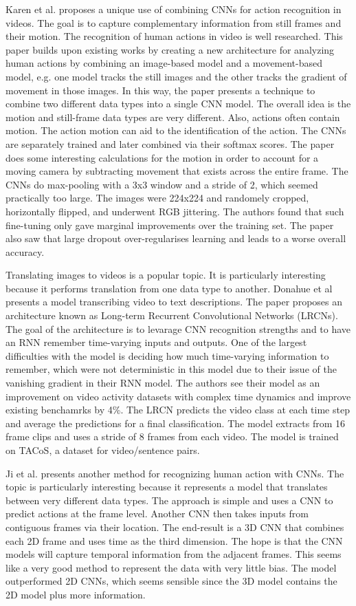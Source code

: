 Karen et al. proposes a unique use of combining CNNs for action recognition in videos.  The goal is to capture complementary information from still frames and their motion. The recognition of human actions in video is well researched.  This paper builds upon existing works by creating a new architecture for analyzing human actions by combining an image-based model and a movement-based model, e.g. one model tracks the still images and the other tracks the gradient of movement in those images.  In this way, the paper presents a technique to combine two different data types into a single CNN model.  The overall idea is the motion and still-frame data types are very different. Also, actions often contain motion.  The action motion can aid to the identification of the action.  The CNNs are separately trained and later combined via their softmax scores.  The paper does some interesting calculations for the motion in order to account for a moving camera by subtracting movement that exists across the entire frame.  The CNNs do max-pooling with a 3x3 window and a stride of 2, which seemed practically too large.  The images were 224x224 and randomely cropped, horizontally flipped, and underwent RGB jittering.  The authors found that such fine-tuning only gave marginal improvements over the training set.  The paper also saw that large dropout over-regularises learning and leads to a worse overall accuracy.

Translating images to videos is a popular topic.  It is particularly interesting because it performs translation from one data type to another.  Donahue et al presents a model transcribing video to text descriptions.  The paper proposes an architecture known as Long-term Recurrent Convolutional Networks (LRCNs).  The goal of the architecture is to levarage CNN recognition strengths and to have an RNN remember time-varying inputs and outputs. One of the largest difficulties with the model is deciding how much time-varying information to remember, which were not deterministic in this model due to their issue of the vanishing gradient in their RNN model.  The authors see their model as an improvement on video activity datasets with complex time dynamics and improve existing benchamrks by 4\%.  The LRCN predicts the video class at each time step and average the predictions for a final classification.  The model extracts from 16 frame clips and uses a stride of 8 frames from each video.  The model is trained on TACoS, a dataset for video/sentence pairs.

Ji et al. presents another method for recognizing human action with CNNs.  The topic is particularly interesting because it represents a model that translates between very different data types.   The approach is simple and uses a CNN to predict actions at the frame level.  Another CNN then takes inputs from contiguous frames via their location.  The end-result is a 3D CNN that combines each 2D frame and uses time as the third dimension.  The hope is that the CNN models will capture temporal information from the adjacent frames.  This seems like a very good method to represent the data with very little bias.  The model outperformed 2D CNNs, which seems sensible since the 3D model contains the 2D model plus more information.

